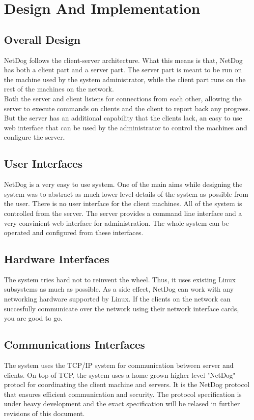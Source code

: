 \chapter{Design And Implementation}

\section{Overall Design}
\par
NetDog follows the client-server architecture. What this means is that, NetDog
has both a client part and a server part. The server part is meant to be run
on the machine used by the system administrator, while the client part runs
on the rest of the machines on the network.\\

Both the server and client listens for connections from each other, allowing
the server to execute commands on clients and the client to report back any
progress. But the server has an additional capability that the clients lack, an
easy to use web interface that can be used by the administrator to control the
machines and configure the server.

\section{User Interfaces}
NetDog is a very easy to use system. One of the main aims while designing the
system was to abstract as much lower level details of the system as possible
from the user. There is no user interface for the client machines. All of the
system is controlled from the server. The server provides a command line
interface and a very convinient web interface for administration. The whole
system can be operated and configured from these interfaces.

\section{Hardware Interfaces}
The system tries hard not to reinvent the wheel. Thus, it uses existing Linux
subsystems as much as possible. As a side effect, NetDog can work with any
networking hardware supported by Linux. If the clients on the network can
succesfully communicate over the network using their network interface cards,
you are good to go.

\section{Communications Interfaces}
The system uses the TCP/IP system for communication between server and clients.
On top of TCP, the system uses a home grown higher level "NetDog" protocl for
coordinating the client machine and servers. It is the NetDog protocol that
ensures efficient communication and security. The protocol specification is
under heavy development and the exact specification will be relased in further
revisions of this document.

